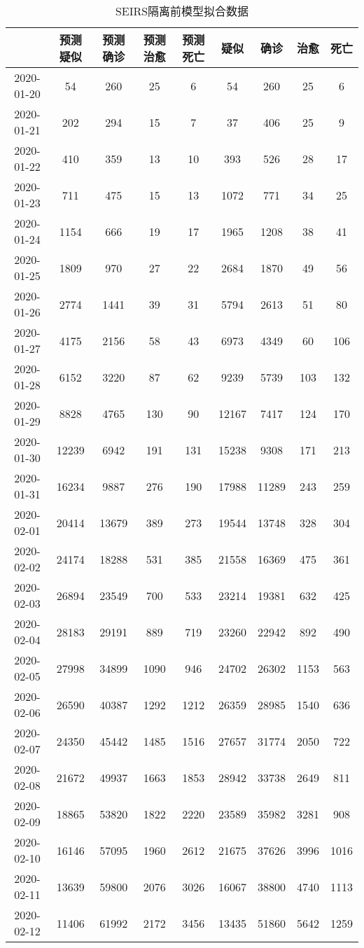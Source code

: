 \begin{longtable}{ccccccccc}
\caption{SEIRS隔离前模型拟合数据}\\
\hline
&预测疑似&预测确诊&预测治愈&预测死亡&疑似&确诊&治愈&死亡\\
\hline
2020-01-20&54&260&25&6&54&260&25&6\\
2020-01-21&202&294&15&7&37&406&25&9\\
2020-01-22&410&359&13&10&393&526&28&17\\
2020-01-23&711&475&15&13&1072&771&34&25\\
2020-01-24&1154&666&19&17&1965&1208&38&41\\
2020-01-25&1809&970&27&22&2684&1870&49&56\\
2020-01-26&2774&1441&39&31&5794&2613&51&80\\
2020-01-27&4175&2156&58&43&6973&4349&60&106\\
2020-01-28&6152&3220&87&62&9239&5739&103&132\\
2020-01-29&8828&4765&130&90&12167&7417&124&170\\
2020-01-30&12239&6942&191&131&15238&9308&171&213\\
2020-01-31&16234&9887&276&190&17988&11289&243&259\\
2020-02-01&20414&13679&389&273&19544&13748&328&304\\
2020-02-02&24174&18288&531&385&21558&16369&475&361\\
2020-02-03&26894&23549&700&533&23214&19381&632&425\\
2020-02-04&28183&29191&889&719&23260&22942&892&490\\
2020-02-05&27998&34899&1090&946&24702&26302&1153&563\\
2020-02-06&26590&40387&1292&1212&26359&28985&1540&636\\
2020-02-07&24350&45442&1485&1516&27657&31774&2050&722\\
2020-02-08&21672&49937&1663&1853&28942&33738&2649&811\\
2020-02-09&18865&53820&1822&2220&23589&35982&3281&908\\
2020-02-10&16146&57095&1960&2612&21675&37626&3996&1016\\
2020-02-11&13639&59800&2076&3026&16067&38800&4740&1113\\
2020-02-12&11406&61992&2172&3456&13435&51860&5642&1259\\
\hline
\end{longtable}